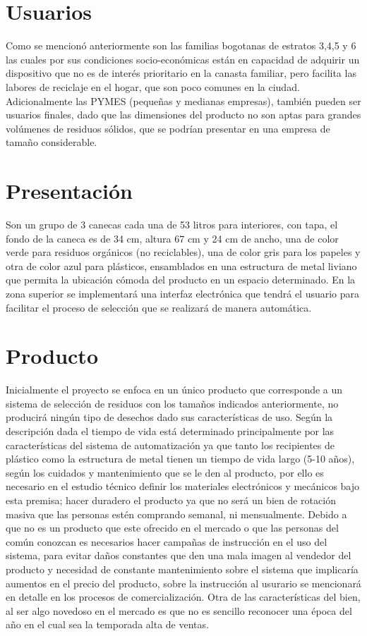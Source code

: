 \documentclass[letterpaper,12pt]{scrreprt}
\begin{document}
    \section{Usuarios}
    Como se mencionó anteriormente son las familias bogotanas de estratos 3,4,5 y 6 las cuales por sus condiciones socio-económicas están en capacidad de adquirir un dispositivo que no es de interés prioritario en la canasta familiar, pero facilita las labores de reciclaje en el hogar, que son poco comunes en la ciudad. Adicionalmente las PYMES (pequeñas y medianas empresas), también pueden ser usuarios finales, dado que las dimensiones del producto no son aptas para grandes volúmenes de residuos sólidos, que se podrían presentar en una empresa de tamaño considerable.

    \section{Presentación}
    Son un grupo de 3 canecas cada una de 53 litros para interiores, con tapa, el fondo de la caneca es de 34 cm, altura 67 cm y 24 cm de ancho, una de color verde para residuos orgánicos (no reciclables), una de color gris para los papeles y otra de color azul para plásticos, ensamblados en una estructura de metal liviano que permita la ubicación cómoda del producto en un espacio determinado. En la zona superior se implementará una interfaz electrónica que tendrá el usuario para facilitar el proceso de selección que se realizará de manera automática.

    \section{Producto}
    Inicialmente el proyecto se enfoca en un único producto que corresponde a un sistema de selección de residuos con los tamaños indicados anteriormente, no producirá ningún tipo de desechos dado sus características de uso. Según la descripción dada el tiempo de vida está determinado principalmente por las características del sistema de automatización ya que tanto los recipientes de plástico como la estructura de metal tienen un tiempo de vida largo (5-10 años), según los cuidados y mantenimiento que se le den al producto, por ello es necesario en el estudio técnico definir los materiales electrónicos y mecánicos bajo esta premisa; hacer duradero el producto ya que no será un bien de rotación masiva que las personas estén comprando semanal, ni mensualmente. Debido a que no es un producto que este ofrecido en el mercado o que las personas del común conozcan es necesarios hacer campañas de instrucción en el uso del sistema, para evitar daños constantes que den una mala imagen al vendedor del producto y necesidad de constante mantenimiento sobre el sistema que implicaría aumentos en el precio del producto, sobre la instrucción al usurario se mencionará en detalle en los procesos de comercialización. Otra de las características del bien, al ser algo novedoso en el mercado es que no es sencillo reconocer una época del año en el cual sea la temporada alta de ventas.
\end{document}
